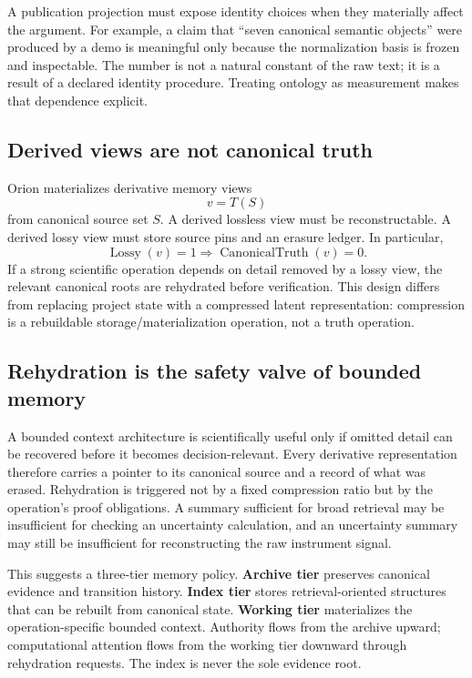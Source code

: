 A publication projection must expose identity choices when they materially affect the argument. For example, a claim that ``seven canonical semantic objects'' were produced by a demo is meaningful only because the normalization basis is frozen and inspectable. The number is not a natural constant of the raw text; it is a result of a declared identity procedure. Treating ontology as measurement makes that dependence explicit.

\subsection{Derived views are not canonical truth}
Orion materializes derivative memory views
\begin{equation}v=T(S)
\end{equation}
from canonical source set $S$. A derived lossless view must be reconstructable. A derived lossy view must store source pins and an erasure ledger. In particular,
\begin{equation}\operatorname{Lossy}(v)=1\Rightarrow\operatorname{CanonicalTruth}(v)=0.
\end{equation}
If a strong scientific operation depends on detail removed by a lossy view, the relevant canonical roots are rehydrated before verification. This design differs from replacing project state with a compressed latent representation: compression is a rebuildable storage/materialization operation, not a truth operation.

\subsection{Rehydration is the safety valve of bounded memory}

A bounded context architecture is scientifically useful only if omitted detail can be recovered before it becomes decision-relevant. Every derivative representation therefore carries a pointer to its canonical source and a record of what was erased. Rehydration is triggered not by a fixed compression ratio but by the operation's proof obligations. A summary sufficient for broad retrieval may be insufficient for checking an uncertainty calculation, and an uncertainty summary may still be insufficient for reconstructing the raw instrument signal.

This suggests a three-tier memory policy. \textbf{Archive tier} preserves canonical evidence and transition history. \textbf{Index tier} stores retrieval-oriented structures that can be rebuilt from canonical state. \textbf{Working tier} materializes the operation-specific bounded context. Authority flows from the archive upward; computational attention flows from the working tier downward through rehydration requests. The index is never the sole evidence root.

